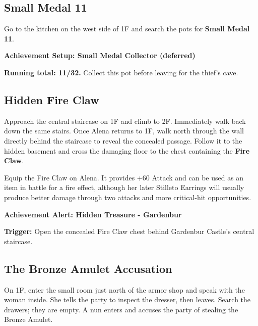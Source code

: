 \documentclass[
  american,
  10pt,
  letterpaper,
  oneside,
  open=any]{scrreprt}
\begin{document}
\subsection{Small Medal 11}\label{small-medal-11}

Go to the kitchen on the west side of 1F and search the pots for
\textbf{Small Medal 11}.

\begin{achievementsetup}

\textbf{Achievement Setup: Small Medal Collector (deferred)}

\textbf{Running total: 11/32.} Collect this pot before leaving for the
thief's cave.

\end{achievementsetup}

\subsection{Hidden Fire Claw}\label{hidden-fire-claw}

Approach the central staircase on 1F and climb to 2F. Immediately walk
back down the same stairs. Once Alena returns to 1F, walk north through
the wall directly behind the staircase to reveal the concealed passage.
Follow it to the hidden basement and cross the damaging floor to the
chest containing the \textbf{Fire Claw}.

Equip the Fire Claw on Alena. It provides +60 Attack and can be used as
an item in battle for a fire effect, although her later Stilleto
Earrings will usually produce better damage through two attacks and more
critical-hit opportunities.

\begin{achievementalert}

\textbf{Achievement Alert: Hidden Treasure - Gardenbur}

\textbf{Trigger:} Open the concealed Fire Claw chest behind Gardenbur
Castle's central staircase.

\end{achievementalert}

\subsection{The Bronze Amulet
Accusation}\label{the-bronze-amulet-accusation}

On 1F, enter the small room just north of the armor shop and speak with
the woman inside. She tells the party to inspect the dresser, then
leaves. Search the drawers; they are empty. A nun enters and accuses the
party of stealing the Bronze Amulet.
\end{document}
